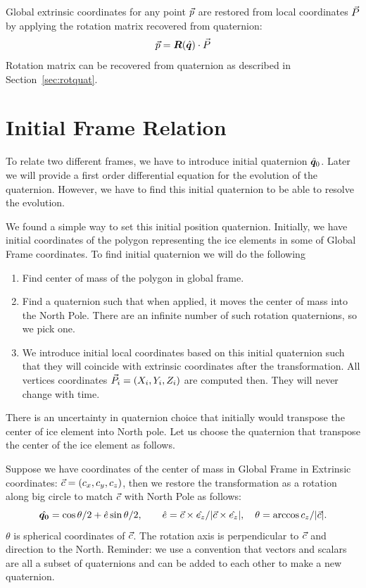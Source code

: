 Global extrinsic coordinates for any point ${{\vec{p}}}$ are restored from
local coordinates ${{\vec{P}}}$ by applying the rotation matrix recovered
from quaternion:
\begin{equation}
  {{\vec{p}}} = {\bm{R}}({\hat{\bm{q}}})\cdot{{\vec{P}}}
\end{equation}
Rotation matrix can be recovered from quaternion as described in
Section~\ref{sec:rotquat}.

\section{Initial Frame Relation}

To relate two different frames, we have to introduce initial
quaternion ${\hat{\bm{q}}}_0$. Later we will provide a first order
differential equation for the evolution of the quaternion. However, we
have to find this initial quaternion to be able to resolve the
evolution.

We found a simple way to set this initial position
quaternion. Initially, we have initial coordinates of the polygon
representing the ice elements in some of Global Frame coordinates. To
find initial quaternion we will do the following
\begin{enumerate}
\item Find center of mass of the polygon in global frame.
\item Find a quaternion such that when applied, it moves the center of
  mass into the North Pole. There are an infinite number of such
  rotation quaternions, so we pick one.
\item We introduce initial local coordinates based on this initial
  quaternion such that they will coincide with extrinsic coordinates
  after the transformation. All vertices coordinates ${{\vec{P}}}_i =
  (X_i,Y_i,Z_i)$ are computed then. They will never change with time.
\end{enumerate}

There is an uncertainty in quaternion choice that initially would
transpose the center of ice element into North pole. Let us choose the
quaternion that transpose the center of the ice element as follows.

Suppose we have coordinates of the center of mass in Global Frame in
Extrinsic coordinates: ${{\vec{c}}}=(c_x,c_y,c_z)$, then we restore the
transformation as a rotation along big circle to match ${{\vec{c}}}$ with
North Pole as follows:
\begin{equation}
  {\hat{\bm{q_0}}} = \cos{\theta/2} + {\hat{e}}\sin{\theta/2},\qquad {\hat{e}} =
  {\vec{c}}\times{\hat{e_z}}/|{\vec{c}}\times{\hat{e_z}}|, \quad \theta =
  \arccos{c_z/|{\vec{c}}|}.
\end{equation}
$\theta$ is spherical coordinates of ${{\vec{c}}}$. The rotation axis is
perpendicular to ${{\vec{c}}}$ and direction to the North. Reminder: we
use a convention that vectors and scalars are all a subset of
quaternions and can be added to each other to make a new quaternion.

